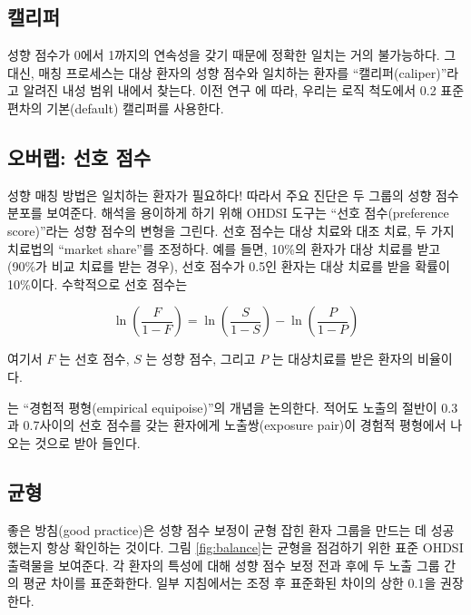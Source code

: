 \documentclass[11pt]{book}
\theoremstyle{definition}
\theoremstyle{definition}
\theoremstyle{definition}
\theoremstyle{remark}
\begin{document}
\subsection{캘리퍼}


성향 점수가 0에서 1까지의 연속성을 갖기 때문에 정확한 일치는 거의
불가능하다. 그 대신, 매칭 프로세스는 대상 환자의 성향 점수와 일치하는
환자를 ``캘리퍼(caliper)''라고 알려진 내성 범위 내에서 찾는다. 이전 연구
\citep{austin_2011} 에 따라, 우리는 로직 척도에서 0.2 표준편차의
기본(default) 캘리퍼를 사용한다.

\subsection{오버랩: 선호 점수}\label{--}


성향 매칭 방법은 일치하는 환자가 필요하다! 따라서 주요 진단은 두 그룹의
성향 점수 분포를 보여준다. 해석을 용이하게 하기 위해 OHDSI 도구는 ``선호
점수(preference score)''라는 성향 점수의 변형을 그린다.
\citep{walker_2013} 선호 점수는 대상 치료와 대조 치료, 두 가지 치료법의
``market share''를 조정하다. 예를 들면, 10\%의 환자가 대상 치료를 받고
(90\%가 비교 치료를 받는 경우), 선호 점수가 0.5인 환자는 대상 치료를
받을 확률이 10\%이다. 수학적으로 선호 점수는

\[\ln\left(\frac{F}{1-F}\right)=\ln\left(\frac{S}{1-S}\right)-\ln\left(\frac{P}{1-P}\right)\]

여기서 \(F\) 는 선호 점수, \(S\) 는 성향 점수, 그리고 \(P\) 는
대상치료를 받은 환자의 비율이다.

\citet{walker_2013} 는 ``경험적 평형(empirical equipoise)''의 개념을
논의한다. 적어도 노출의 절반이 0.3과 0.7사이의 선호 점수를 갖는 환자에게
노출쌍(exposure pair)이 경험적 평형에서 나오는 것으로 받아 들인다.

\subsection{균형}

 

좋은 방침(good practice)은 성향 점수 보정이 균형 잡힌 환자 그룹을 만드는
데 성공했는지 항상 확인하는 것이다. 그림 \ref{fig:balance}는 균형을
점검하기 위한 표준 OHDSI 출력물을 보여준다. 각 환자의 특성에 대해 성향
점수 보정 전과 후에 두 노출 그룹 간의 평균 차이를 표준화한다. 일부
지침에서는 조정 후 표준화된 차이의 상한 0.1을 권장한다.
\citep{rubin_2001}
\end{document}
